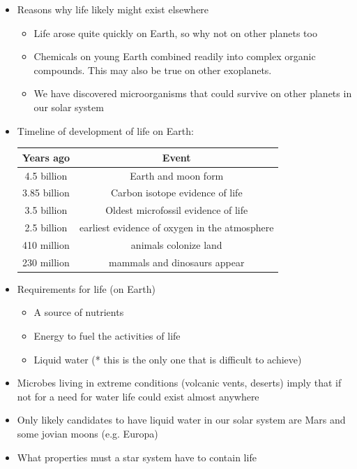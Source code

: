 \documentclass[12pt]{article}
\begin{document}
\begin{itemize}
    \item Reasons why life likely might exist elsewhere
    \begin{itemize}
        \item Life arose quite quickly on Earth, so why not on other planets too
        \item Chemicals on young Earth combined readily into complex organic compounds.  This may also be true on other exoplanets.
        \item We have discovered microorganisms that could survive on other planets in our solar system
    \end{itemize}
    \item Timeline of development of life on Earth:\\
    \begin{tabular}{|c|c|}
        \hline
        Years ago & Event \\ \hline
        4.5 billion & Earth and moon form\\
        3.85 billion & Carbon isotope evidence of life\\
        3.5 billion & Oldest microfossil evidence of life\\
        2.5 billion & earliest evidence of oxygen in the atmosphere\\
        410 million & animals colonize land\\
        230 million & mammals and dinosaurs appear \\ \hline
    \end{tabular}
    \item Requirements for life (on Earth)
    \begin{itemize}
        \item A source of nutrients
        \item Energy to fuel the activities of life
        \item Liquid water (* this is the only one that is difficult to achieve)
    \end{itemize}
    \item Microbes living in extreme conditions (volcanic vents, deserts) imply that if not for a need for water life could exist almost anywhere
    \item Only likely candidates to have liquid water in our solar system are Mars and some jovian moons (e.g. Europa)
    \item What properties must a star system have to contain life
    \begin{itemize}

\end{itemize}
\end{itemize}
\end{document}
